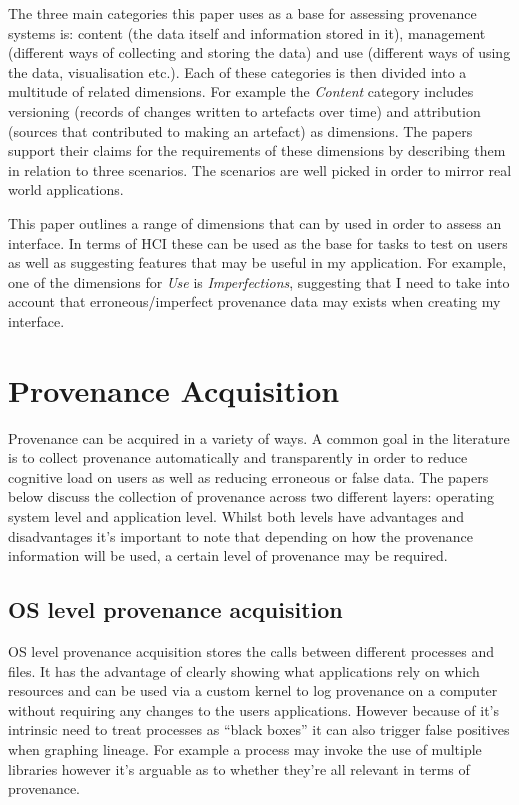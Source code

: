 The three main categories this paper uses as a base for assessing provenance systems is: content (the data itself and information stored in it), management (different ways of collecting and storing the data) and use (different ways of using the data, visualisation etc.). Each of these categories is then divided into a multitude of related dimensions. For example the \textit{Content} category includes versioning (records of changes written to artefacts over time) and attribution (sources that contributed to making an artefact) as dimensions. The papers support their claims for the requirements of these dimensions by describing them in relation to three scenarios. The scenarios are well picked in order to mirror real world applications.

This paper outlines a range of dimensions that can by used in order to assess an interface. In terms of HCI these can be used as the base for tasks to test on users as well as suggesting features that may be useful in my application. For example, one of the dimensions for \textit{Use} is \textit{Imperfections}, suggesting that I need to take into account that erroneous/imperfect provenance data may exists when creating my interface.

\section{Provenance Acquisition}
\label{sec:provenance_acquisition}

Provenance can be acquired in a variety of ways. A common goal in the literature is to collect provenance automatically and transparently in order to reduce cognitive load on users as well as reducing erroneous or false data. The papers below discuss the collection of provenance across two different layers: operating system level and application level. Whilst both levels have advantages and disadvantages it's important to note that depending on how the provenance information will be used, a certain level of provenance may be required.

\subsection{OS level provenance acquisition}
\label{sub:os_level_provenance_acquisition}

OS level provenance acquisition stores the calls between different processes and files. It has the advantage of clearly showing what applications rely on which resources and can be used via a custom kernel to log provenance on a computer without requiring any changes to the users applications.
However because of it's intrinsic need to treat processes as ``black boxes'' it can also trigger false positives when graphing lineage. For example a process may invoke the use of multiple libraries however it's arguable as to whether they're all relevant in terms of provenance.

